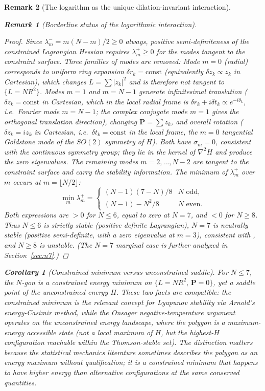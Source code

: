 \documentclass[12pt, a4paper]{article}
\newtheorem{corollary}[theorem]{Corollary}
\newtheorem{remark}{Remark}[section]
\numberwithin{equation}{section}
\begin{document}
\begin{remark}[The logarithm as the unique dilation-invariant interaction]
\begin{remark}[Borderline status of the logarithmic interaction]
\begin{proof}
Since $\lambda_m^- = m(N{-}m)/2 \ge 0$ always, positive
semi-definiteness of the constrained Lagrangian Hessian requires
$\lambda_m^+ \ge 0$ for the modes tangent to the constraint surface.
Three families of modes are removed:
\emph{Mode $m = 0$ (radial)} corresponds to uniform ring expansion
$\delta r_k = \mathrm{const}$ (equivalently $\delta z_k \propto z_k$
in Cartesian), which changes $L = \sum|z_k|^2$ and is therefore not
tangent to $\{L = NR^2\}$.
\emph{Modes $m = 1$ and $m = N-1$} generate infinitesimal translation
($\delta z_k = \mathrm{const}$ in Cartesian, which in the local
radial frame is $\delta r_k + i\delta t_k \propto e^{-i\theta_k}$,
i.e.\ Fourier mode $m = N-1$; the complex conjugate mode $m = 1$
gives the orthogonal translation direction), changing
$\mathbf{P} = \sum z_k$, and
overall rotation ($\delta z_k = iz_k$ in Cartesian, i.e.\
$\delta t_k = \mathrm{const}$ in the local frame, the $m = 0$
tangential Goldstone mode of the $SO(2)$
symmetry of $H$).  Both have $\sigma_m = 0$, consistent with the
continuous symmetry group; they lie in the kernel of $\nabla^2 H$ and
produce the zero eigenvalues.
The remaining modes $m = 2, \ldots, N-2$ are tangent to the constraint
surface and carry the stability information.  The minimum of
$\lambda_m^+$ over $m$ occurs at $m = \lfloor N/2 \rfloor$:
\[
  \min_m \lambda_m^+ = \begin{cases}
    (N{-}1)(7{-}N)/8 & N \text{ odd}, \\
    (N{-}1) - N^2/8 & N \text{ even}.
  \end{cases}
\]
Both expressions are $> 0$ for $N \le 6$, equal to zero at $N = 7$,
and $< 0$ for $N \ge 8$.  Thus $N \le 6$ is \emph{strictly} stable
(positive definite Lagrangian), $N = 7$ is \emph{neutrally} stable
(positive semi-definite, with a zero eigenvalue at $m = 3$),
consistent with \citet{Havelock1931}, and $N \ge 8$ is unstable.
(The $N = 7$ marginal case is further analyzed in
Section~\ref{sec:n7}.)
\end{proof}

\begin{corollary}[Constrained minimum versus unconstrained saddle]
\label{cor:min-not-max}
For $N \le 7$, the $N$-gon is a constrained energy \emph{minimum}
on $\{L = NR^2,\, \mathbf{P} = 0\}$, yet a saddle point of the
unconstrained energy $H$.  These two facts are compatible: the
constrained minimum is the relevant concept for Lyapunov stability
via Arnold's energy-Casimir method, while the Onsager
negative-temperature argument operates on the unconstrained energy
landscape, where the polygon is a maximum-energy \emph{accessible}
state (not a local maximum of $H$, but the highest-$H$ configuration
reachable within the Thomson-stable set).  The distinction matters
because the statistical mechanics literature sometimes describes the
polygon as an energy maximum without qualification; it is a
constrained minimum that happens to have higher energy than
alternative configurations at the same conserved quantities.
\end{corollary}


\end{remark}
\end{remark}
\end{document}
